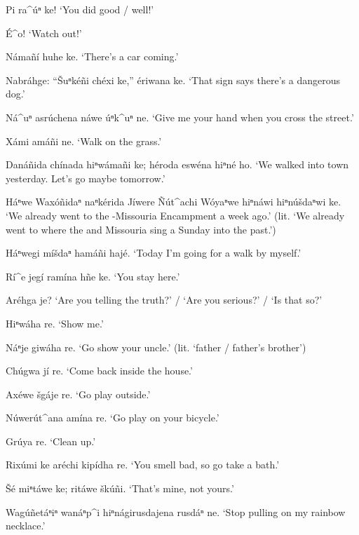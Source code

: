 \documentclass[output=paper]{LSP/langsci}
\begin{document}

\begin{list}{}{} \itemsep1pt \parskip0pt 
\item{Pi ra\^{ }úⁿ ke! `You did good / well!'}
\item{\'E\^{ }o! `Watch out!'}
\item{Námañí huhe ke. `There's a car coming.'}
\item{Nabráhge: ``\v{S}uⁿkéñi chéxi ke,'' ériwana ke. `That sign says there's a dangerous dog.'}
\item{Ná\^{ }uⁿ asrúchena náwe úⁿk\^{ }uⁿ ne. `Give me your hand when you cross the street.'}
\item{Xámi amáñi ne. `Walk on the grass.'}
\item{Danáñida chínada hiⁿwámañi ke; héroda eswéna hiⁿné ho. `We walked into town yesterday. Let's go maybe tomorrow.'}
\item{Háⁿwe Waxóñidaⁿ naⁿkérida Jíwere \~Nút\^{ }achi Wóyaⁿwe hiⁿnáwi hiⁿnúšdaⁿwi ke. `We already went to the -Missouria Encampment a week ago.' (lit. `We already went to where the  and Missouria sing a Sunday into the past.')}
\item{Háⁿwegi míšdaⁿ hamáñi hajé.  `Today I'm going for a walk by myself.'}
\item{Rí\^{ }e jegí ramína hñe ke. `You stay here.'}
\item{Aréhga je? `Are you telling the truth?' / `Are you serious?' / `Is that so?'}
\item{Hiⁿwáha re. `Show me.'}
\item{Náⁿje giwáha re. `Go show your uncle.' (lit. `father / father's brother')}
\item{Chúgwa jí re.	`Come back inside the house.'}
\item{}
\item{Axéwe šgáje re. `Go play outside.'}
\item{Núwerút\^{ }ana amína re.	`Go play on your bicycle.'}
\item{Grúya re.	`Clean up.'}
\item{Rixúmi ke aréchi kipídha re. `You smell bad, so go take a bath.'}
\item{\v{S}é miⁿtáwe ke;  ritáwe škúñi. `That's mine, not yours.'}
\item{Wagúñetáⁿiⁿ wanáⁿp\^{ }i hiⁿnágirusdajena rusdáⁿ ne. `Stop pulling on my rainbow necklace.'}
\end{list} 
 
\end{document}
